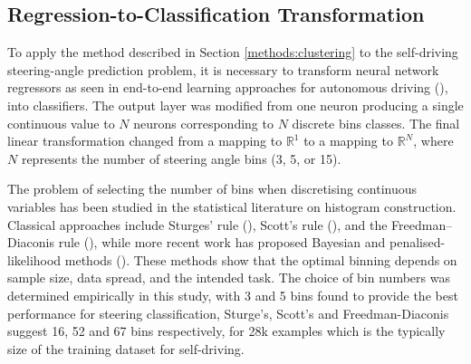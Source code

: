 


\subsection{Regression-to-Classification Transformation}
\label{methods:regression_classification}

To apply the method described in Section \ref{methods:clustering} to the self-driving steering-angle prediction problem, it is necessary to transform neural network regressors as seen in end-to-end learning approaches for autonomous driving (\cite{lecun2004dave,bojarski2016end}), into classifiers. The output layer was modified from one neuron producing a single continuous value to $N$ neurons corresponding to $N$ discrete bins classes. The final linear transformation changed from a mapping to $\mathbb{R}^1$ to a mapping to $\mathbb{R}^N$, where $N$ represents the number of steering angle bins (3, 5, or 15). 

The problem of selecting the number of bins when discretising continuous variables has been studied in the statistical literature on histogram construction. Classical approaches include Sturges’ rule (\cite{sturges1926}), Scott’s rule (\cite{scott1979}), and the Freedman–Diaconis rule (\cite{freedman1981}), while more recent work has proposed Bayesian and penalised-likelihood methods (\cite{knuth2006,birge2006}). These methods show that the optimal binning depends on sample size, data spread, and the intended task. The choice of bin numbers was determined empirically in this study, with 3 and 5 bins found to provide the best performance for steering classification, Sturge's, Scott's and Freedman-Diaconis suggest 16, 52 and 67 bins respectively, for 28k examples which is the typically size of the training dataset for self-driving.

